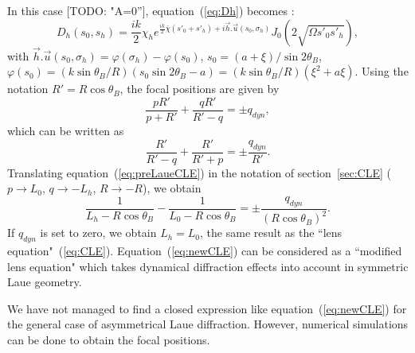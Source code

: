 \documentclass[preprint]{iucr}              %
\newcommand{\todo}[1]{{\color{red}[TODO: "#1'']}}
\newcommand{\inred}[1]{{\color{red}#1}}
\begin{document}

In this case \todo{A=0}, equation~(\ref{eq:Dh}) becomes \cite{GuigayFerrero2013}:
\begin{equation}
\label{eq:DhSymmetricalLaue}
    D_h(s_0,s_h) = \frac{i k}{2} \chi_h e^{\frac{i k}{2} \bar \chi (s'_0+s'_h) + i \vec h . \vec u (s_0,\sigma_h)}
    J_0(2\sqrt{\Omega s'_0 s'_h}), 
\end{equation}
with $\vec h . \vec u (s_0,\sigma_h) = \varphi(\sigma_h)-\varphi(s_0) $, $s_0=(a+\xi)/\sin2\theta_B$, $\varphi(s_0)=(k \sin\theta_B / R)(s_0 \sin2\theta_B - a)=(k \sin\theta_B / R)(\xi^2+a\xi)$.
Using the notation $R'=R \cos\theta_B$, the focal positions are given by 
\begin{equation}
    \frac{p R'}{p+R'} + \frac{q R'}{R' - q} = \pm q_{dyn},
\end{equation}
which can be written as
\begin{equation}
\label{eq:preLaueCLE}
    \frac{R'}{R'-q} + \frac{R'}{R' + p} = \pm \frac{q_{dyn}}{R'}.
\end{equation}
Translating equation~(\ref{eq:preLaueCLE}) in the notation of section~\ref{sec:CLE} ($p \to L_0$, $q \to -L_h$, $R \to -R$), we obtain
\begin{equation}
\label{eq:newCLE}
    \frac{1}{L_h-R \cos\theta_B} -
    \frac{1}{L_0 - R \cos\theta_B} =
    \pm \frac{q_{dyn}}{(R \cos\theta_B)^2}.
\end{equation}
If $q_{dyn}$ is set to zero, we obtain $L_h=L_0$, the same result as the ``lens equation"~(\ref{eq:CLE}).
Equation~(\ref{eq:newCLE}) can be considered as a ``modified lens equation" which takes dynamical diffraction effects into account in symmetric Laue geometry.


\inred{We have not managed to find a closed expression like equation~(\ref{eq:newCLE}) for the general case of asymmetrical Laue diffraction. However, numerical simulations can be done to obtain the focal positions. }


\end{document}
